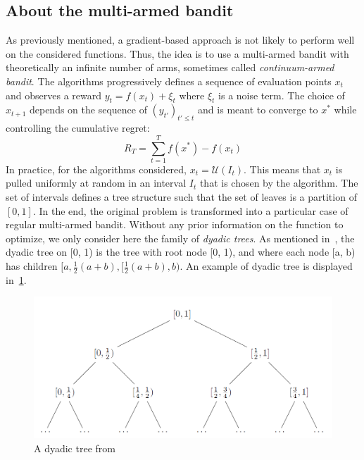 \documentclass[a4paper,10pt]{article}
\begin{document}
\subsection{About the multi-armed bandit}
As previously mentioned, a gradient-based approach is not likely to perform well on the considered functions. Thus, the idea is to use a multi-armed bandit with theoretically an infinite number of arms, sometimes called \textit{continuum-armed bandit}. The algorithms progressively defines a sequence of evaluation points $x_t$ and observes a reward $y_t=f(x_t)+\xi_t$ where $\xi_t$ is a noise term. The choice of $x_{t+1}$ depends on the sequence of $(y_{t'})_{t'\le t}$ and is meant to converge to $x^*$ while controlling the cumulative regret:
\begin{equation}
\label{regret}
R_T = \underset{t=1}{\overset{T}{\sum}}f(x^*)-f(x_t)
\end{equation}
In practice, for the algorithms considered, $x_t = \mathcal{U}(I_t)$. This means that $x_t$ is pulled uniformly at random in an interval $I_t$ that is chosen by the algorithm. The set of intervals defines a tree structure such that the set of leaves is a partition of $[0,1]$. In the end, the original problem is transformed into a particular case of regular multi-armed bandit. Without any prior information on the function to optimize, we only consider here the family of \textit{dyadic trees}. As mentioned in~\cite{bull2013adaptive}, the dyadic tree on [0, 1) is the tree with root node [0, 1), and where each node [a, b) has children $[a, \frac{1}{2}(a+b), [ \frac{1}{2}(a+b), b)$. An example of dyadic tree is displayed in~\ref{dydtree}.

\begin{figure}
\label{dydtree}
\centering
\includegraphics[scale=0.3]{dyadic}
\caption{A dyadic tree from~\cite{bull2013adaptive}}
\end{figure}
\end{document}
